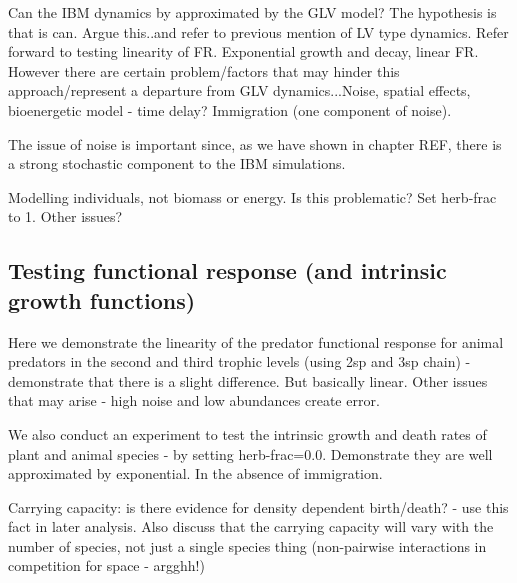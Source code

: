 Can the IBM dynamics by approximated by the GLV model? The hypothesis is that is can. Argue this..and refer to previous mention of LV type dynamics. Refer forward to testing linearity of FR. Exponential growth and decay, linear FR. However there are certain problem/factors that may hinder this approach/represent a departure from GLV dynamics...Noise, spatial effects, bioenergetic model - time delay? Immigration (one component of noise).

The issue of noise is important since, as we have shown in chapter REF, there is a strong stochastic component to the IBM simulations. 

Modelling individuals, not biomass or energy. Is this problematic? Set herb-frac to 1. Other issues?

\subsection{Testing functional response (and intrinsic growth functions)}

Here we demonstrate the linearity of the predator functional response for animal predators in the second and third trophic levels (using 2sp and 3sp chain) - demonstrate that there is a slight difference. But basically linear. Other issues that may arise - high noise and low abundances create error. 

We also conduct an experiment to test the intrinsic growth and death rates of plant and animal species - by setting herb-frac=0.0. Demonstrate they are well approximated by exponential. In the absence of immigration. 

Carrying capacity: is there evidence for density dependent birth/death? - use this fact in later analysis. Also discuss that the carrying capacity will vary with the number of species, not just a single species thing (non-pairwise interactions in competition for space - argghh!)

